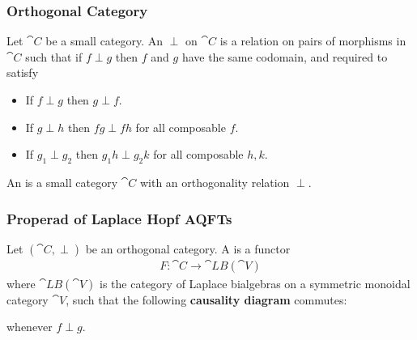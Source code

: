 \documentclass{beamer}
\begin{document}




\begin{frame}

\frametitle{Orthogonal Category}

Let $\cat{C}$ be a small category. An  $\perp$ on $\cat{C}$ is a relation on pairs of morphisms in $\cat{C}$ such that if $f \perp g$
then $f$ and $g$ have the same codomain, and required to satisfy
\begin{itemize}
\item If $f \perp g$ then $g \perp f$.

\item If $g \perp h$ then $fg \perp fh$ for all composable $f$.

\item If $g_1 \perp g_2$ then $g_1 h \perp g_2 k$ for all composable $h,k$.
\end{itemize}

\medskip

An  is a small category $\cat{C}$ with an orthogonality relation $\perp$.


\end{frame}


\begin{frame}

\frametitle{Properad of Laplace Hopf AQFTs}


Let $(\cat{C}, \perp)$ be an orthogonal category. A  is a functor
\begin{align*}
F: \cat{C} \to \cat{LB}(\cat{V})
\end{align*}
where $\cat{LB}(\cat{V})$ is the category of Laplace bialgebras on a symmetric monoidal category $\cat{V}$, such that the following \textbf{causality diagram} commutes:

\medskip

\begin{center}
\end{center}

\medskip 

whenever $f \perp g$.

\end{frame}
\end{document}
